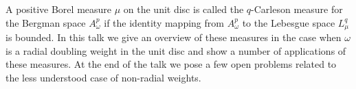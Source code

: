 {%
    A positive Borel measure $\mu$ on the unit disc is called the
    $q$-Carleson measure for the Bergman space $A^p_\omega$ if
    the identity mapping from $A^p_\omega$ to the Lebesgue space
    $L^q_\mu$ is bounded. In this talk we give an overview of these
    measures in the case when $\omega$ is a radial doubling weight
    in the unit disc and show a number of applications of these
    measures. At the end of the talk we pose a few open problems
    related to the less understood case of non-radial weights.
}

